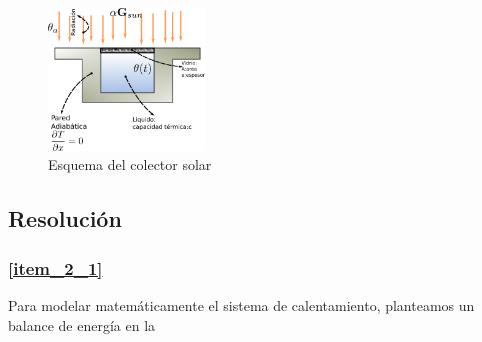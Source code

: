 \documentclass[10pt]{article}
\begin{document}
\begin{figure}[H]
   \centering
   \includegraphics[width=0.37\textwidth]{Images/colector_esquema.eps}
   \caption{Esquema del colector solar}\label{fig:colector_esquema}
\end{figure}
\subsection{Resolución}
\subsubsection{\ref{item_2_1}}
Para modelar matemáticamente el sistema de calentamiento, planteamos un balance de energía en la

\end{document}
